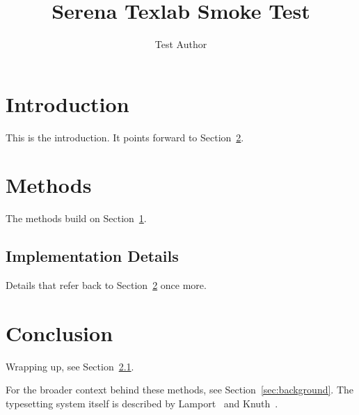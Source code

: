 \documentclass{article}
\title{Serena Texlab Smoke Test}
\author{Test Author}
\begin{document}
\maketitle

\section{Introduction}
\label{sec:intro}
This is the introduction. It points forward to Section~\ref{sec:methods}.

\section{Methods}
\label{sec:methods}
The methods build on Section~\ref{sec:intro}.

\subsection{Implementation Details}
\label{sec:details}
Details that refer back to Section~\ref{sec:methods} once more.

\section{Conclusion}
\label{sec:conclusion}
Wrapping up, see Section~\ref{sec:details}.



For the broader context behind these methods, see Section~\ref{sec:background}.
The typesetting system itself is described by Lamport~\cite{lamport1994} and
Knuth~\cite{knuth1984}.



\end{document}
